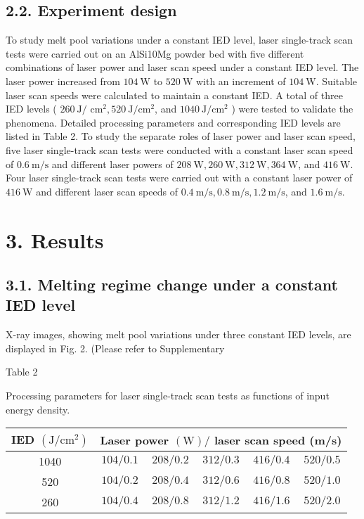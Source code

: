\documentclass[10pt]{article}
\begin{document}
\subsection*{2.2. Experiment design}
To study melt pool variations under a constant IED level, laser single-track scan tests were carried out on an AlSi10Mg powder bed with five different combinations of laser power and laser scan speed under a constant IED level. The laser power increased from $104 \mathrm{~W}$ to $520 \mathrm{~W}$ with an increment of $104 \mathrm{~W}$. Suitable laser scan speeds were calculated to maintain a constant IED. A total of three IED levels ( $260 \mathrm{~J} /$ $\mathrm{cm}^{2}, 520 \mathrm{~J} / \mathrm{cm}^{2}$, and $1040 \mathrm{~J} / \mathrm{cm}^{2}$ ) were tested to validate the phenomena. Detailed processing parameters and corresponding IED levels are listed in Table 2. To study the separate roles of laser power and laser scan speed, five laser single-track scan tests were conducted with a constant laser scan speed of $0.6 \mathrm{~m} / \mathrm{s}$ and different laser powers of $208 \mathrm{~W}, 260 \mathrm{~W}, 312 \mathrm{~W}, 364 \mathrm{~W}$, and $416 \mathrm{~W}$. Four laser single-track scan tests were carried out with a constant laser power of $416 \mathrm{~W}$ and different laser scan speeds of $0.4 \mathrm{~m} / \mathrm{s}, 0.8 \mathrm{~m} / \mathrm{s}, 1.2 \mathrm{~m} / \mathrm{s}$, and $1.6 \mathrm{~m} / \mathrm{s}$.

\section*{3. Results}
\subsection*{3.1. Melting regime change under a constant IED level}
X-ray images, showing melt pool variations under three constant IED levels, are displayed in Fig. 2. (Please refer to Supplementary

Table 2

Processing parameters for laser single-track scan tests as functions of input energy density.

\begin{center}
\begin{tabular}{cccccc}
\hline
IED $\left(\mathrm{J} / \mathrm{cm}^{2}\right)$ & \multicolumn{5}{c}{Laser power $(\mathrm{W}) /$ laser scan speed (m/s)} \\
\hline
1040 & $104 / 0.1$ & $208 / 0.2$ & $312 / 0.3$ & $416 / 0.4$ & $520 / 0.5$ \\
520 & $104 / 0.2$ & $208 / 0.4$ & $312 / 0.6$ & $416 / 0.8$ & $520 / 1.0$ \\
260 & $104 / 0.4$ & $208 / 0.8$ & $312 / 1.2$ & $416 / 1.6$ & $520 / 2.0$ \\
\hline
\end{tabular}
\end{center}
\end{document}
